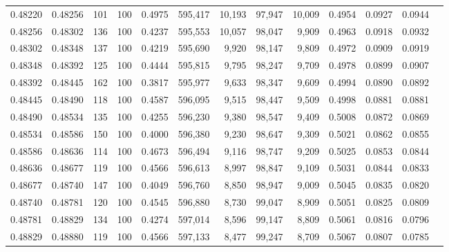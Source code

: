 \begin{tabular}{rrrrrrrrrrrrr}
0.48220 & 0.48256 &   101 & 100 &                                     0.4975 & 595,417 &  10,193 &  97,947 &  10,009 & 0.4954 & 0.0927 & 0.0944 \\
0.48256 & 0.48302 &   136 & 100 &                                     0.4237 & 595,553 &  10,057 &  98,047 &   9,909 & 0.4963 & 0.0918 & 0.0932 \\
0.48302 & 0.48348 &   137 & 100 &                                     0.4219 & 595,690 &   9,920 &  98,147 &   9,809 & 0.4972 & 0.0909 & 0.0919 \\
0.48348 & 0.48392 &   125 & 100 &                                     0.4444 & 595,815 &   9,795 &  98,247 &   9,709 & 0.4978 & 0.0899 & 0.0907 \\
0.48392 & 0.48445 &   162 & 100 &                                     0.3817 & 595,977 &   9,633 &  98,347 &   9,609 & 0.4994 & 0.0890 & 0.0892 \\
0.48445 & 0.48490 &   118 & 100 &                                     0.4587 & 596,095 &   9,515 &  98,447 &   9,509 & 0.4998 & 0.0881 & 0.0881 \\
0.48490 & 0.48534 &   135 & 100 &                                     0.4255 & 596,230 &   9,380 &  98,547 &   9,409 & 0.5008 & 0.0872 & 0.0869 \\
0.48534 & 0.48586 &   150 & 100 &                                     0.4000 & 596,380 &   9,230 &  98,647 &   9,309 & 0.5021 & 0.0862 & 0.0855 \\
0.48586 & 0.48636 &   114 & 100 &                                     0.4673 & 596,494 &   9,116 &  98,747 &   9,209 & 0.5025 & 0.0853 & 0.0844 \\
0.48636 & 0.48677 &   119 & 100 &                                     0.4566 & 596,613 &   8,997 &  98,847 &   9,109 & 0.5031 & 0.0844 & 0.0833 \\
0.48677 & 0.48740 &   147 & 100 &                                     0.4049 & 596,760 &   8,850 &  98,947 &   9,009 & 0.5045 & 0.0835 & 0.0820 \\
0.48740 & 0.48781 &   120 & 100 &                                     0.4545 & 596,880 &   8,730 &  99,047 &   8,909 & 0.5051 & 0.0825 & 0.0809 \\
0.48781 & 0.48829 &   134 & 100 &                                     0.4274 & 597,014 &   8,596 &  99,147 &   8,809 & 0.5061 & 0.0816 & 0.0796 \\
0.48829 & 0.48880 &   119 & 100 &                                     0.4566 & 597,133 &   8,477 &  99,247 &   8,709 & 0.5067 & 0.0807 & 0.0785 \\

\end{tabular}
